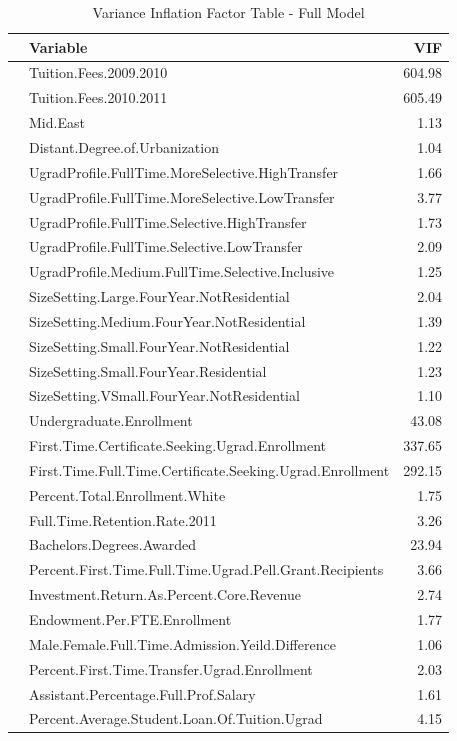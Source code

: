 \documentclass{article}
\begin{document}
\begin{table}[ht]
\centering
\footnotesize
\begin{tabular}{rlr}
  \hline
 & Variable & VIF \\ 
  \hline
 & Tuition.Fees.2009.2010 & 604.98 \\ 
   & Tuition.Fees.2010.2011 & 605.49 \\ 
   & Mid.East & 1.13 \\ 
   & Distant.Degree.of.Urbanization & 1.04 \\ 
   & UgradProfile.FullTime.MoreSelective.HighTransfer & 1.66 \\ 
   & UgradProfile.FullTime.MoreSelective.LowTransfer & 3.77 \\ 
   & UgradProfile.FullTime.Selective.HighTransfer & 1.73 \\ 
   & UgradProfile.FullTime.Selective.LowTransfer & 2.09 \\ 
   & UgradProfile.Medium.FullTime.Selective.Inclusive & 1.25 \\ 
   & SizeSetting.Large.FourYear.NotResidential & 2.04 \\ 
   & SizeSetting.Medium.FourYear.NotResidential & 1.39 \\ 
   & SizeSetting.Small.FourYear.NotResidential & 1.22 \\ 
   & SizeSetting.Small.FourYear.Residential & 1.23 \\ 
   & SizeSetting.VSmall.FourYear.NotResidential & 1.10 \\ 
   & Undergraduate.Enrollment & 43.08 \\ 
   & First.Time.Certificate.Seeking.Ugrad.Enrollment & 337.65 \\ 
   & First.Time.Full.Time.Certificate.Seeking.Ugrad.Enrollment & 292.15 \\ 
   & Percent.Total.Enrollment.White & 1.75 \\ 
   & Full.Time.Retention.Rate.2011 & 3.26 \\ 
   & Bachelors.Degrees.Awarded & 23.94 \\ 
   & Percent.First.Time.Full.Time.Ugrad.Pell.Grant.Recipients & 3.66 \\ 
   & Investment.Return.As.Percent.Core.Revenue & 2.74 \\ 
   & Endowment.Per.FTE.Enrollment & 1.77 \\ 
   & Male.Female.Full.Time.Admission.Yeild.Difference & 1.06 \\ 
   & Percent.First.Time.Transfer.Ugrad.Enrollment & 2.03 \\ 
   & Assistant.Percentage.Full.Prof.Salary & 1.61 \\ 
   & Percent.Average.Student.Loan.Of.Tuition.Ugrad & 4.15 \\ 
   \hline
\end{tabular}
\caption{Variance Inflation Factor Table - Full Model} 
\end{table}
\FloatBarrier
\end{document}
